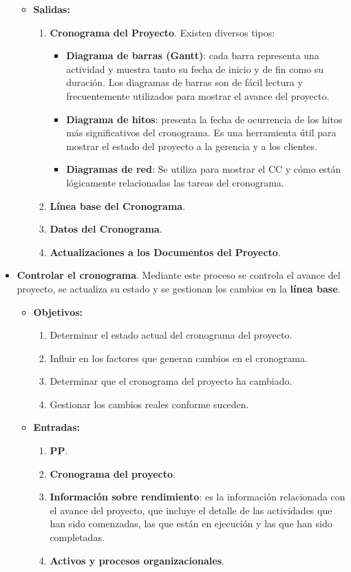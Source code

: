 \documentclass[10pt,a4paper]{article}
\begin{document}
\begin{itemize}
\begin{itemize}
\item \textbf{Salidas:}
\begin{enumerate}
\item \textbf{Cronograma del Proyecto}. Existen diversos tipos:
\begin{itemize}
\item \textbf{Diagrama de barras (Gantt)}: cada barra representa una actividad y muestra tanto su fecha de inicio y de fin como su duración. Los diagramas de barras son de fácil lectura y frecuentemente utilizados para mostrar el avance del proyecto.
\item \textbf{Diagrama de hitos}: presenta la fecha de ocurrencia de los hitos más significativos del cronograma. Es una herramienta útil para mostrar el estado del proyecto a la gerencia y a los clientes.
\item \textbf{Diagramas de red}: Se utiliza para mostrar el CC y cómo están lógicamente relacionadas las tareas del cronograma.
\end{itemize}
\item \textbf{Línea base del Cronograma}.
\item \textbf{Datos del Cronograma}.
\item \textbf{Actualizaciones a los Documentos del Proyecto}.
\end{enumerate}
\end{itemize}

\item \textbf{Controlar el cronograma}. Mediante este proceso se controla el avance del proyecto, se actualiza su estado y se gestionan los cambios en la \textbf{línea base}.

\begin{itemize}
\item \textbf{Objetivos:}
\begin{enumerate}
\item Determinar el estado actual del cronograma del proyecto.
\item Influir en los factores que generan cambios en el cronograma.
\item Determinar que el cronograma del proyecto ha cambiado.
\item Gestionar los cambios reales conforme suceden.
\end{enumerate}

\item \textbf{Entradas:}
\begin{enumerate}
\item \textbf{PP}.
\item \textbf{Cronograma del proyecto}.
\item \textbf{Información sobre rendimiento}: es la información relacionada con el avance del proyecto, que incluye el detalle de las actividades que han sido comenzadas, las que están en ejecución y las que han sido completadas.
\item \textbf{Activos y procesos organizacionales}.
\end{enumerate}


\end{itemize}
\end{itemize}
\end{document}
